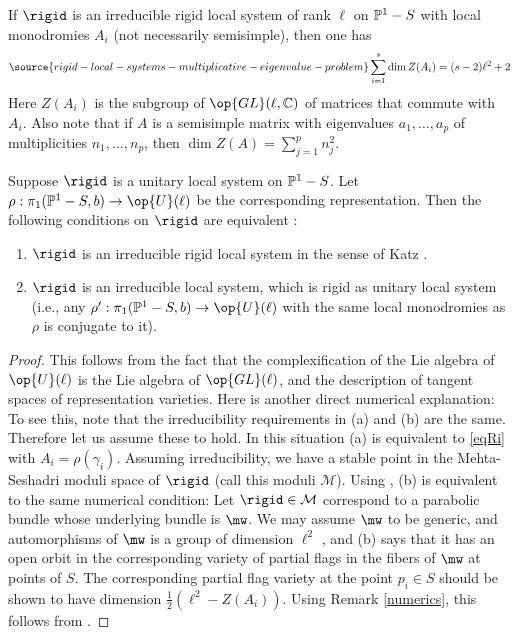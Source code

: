 \begin{remark}
\notready\label{numerics}
If $\rigid$  is an irreducible rigid local system of rank $\ell$  on $\Bbb{P}^1-S$ with local monodromies $A_i$ (not necessarily semisimple), then one has \cite[Theorem 1.1.2]{Katz}
\begin{equation}\label{eqRi}
\source{rigid-local-systems-multiplicative-eigenvalue-problem}
\sum_{i=1}^s \dim Z(A_i)= (s-2) \ell^2+2
\end{equation}
Here $Z(A_i)$ is the subgroup of $\op{GL}(\ell,\Bbb{C})$ of matrices that commute with $A_i$. Also note that if $A$ is a semisimple matrix  with eigenvalues $a_1,\dots,a_p$ of multiplicities $n_1,\dots,n_p$, then $\dim Z(A)=\sum_{j=1}^p n_j^2$.
\end{remark}
\begin{lemma}
\notready\label{RigidRem}
Suppose  $\rigid$ is a  unitary local system on $\Bbb{P}^1-S$. Let $\rho: \pi_1(\Bbb{P}^1-S,b)\to \op{U}(\ell)$ be the  corresponding representation. Then the following conditions on $\rigid$ are equivalent :
\begin{enumerate}
\item[(a)]$\rigid$ is an irreducible rigid local system in the sense of Katz \cite{Katz}.
\item[(b)] $\rigid$ is an irreducible local system, which is rigid as unitary local system (i.e., any $\rho': \pi_1(\Bbb{P}^1-S,b)\to \op{U}(\ell)$ with the same local monodromies as $\rho$ is conjugate to it).
\end{enumerate}
\end{lemma}
\begin{proof}
This follows from the fact that the complexification of the Lie algebra of $\op{U}(\ell)$ is the Lie algebra of $\op{GL}(\ell)$, and the description of tangent spaces of representation varieties. Here is another direct numerical explanation:
To see this, note that the irreducibility requirements in (a) and (b) are the same. Therefore let us assume these to hold. In this situation (a) is equivalent to \eqref{eqRi}  with $A_i=\rho(\gamma_i)$.
Assuming irreducibility, we have a stable point in the Mehta-Seshadri moduli space of $\rigid$ (call this moduli $\mathcal{M}$). Using \cite[Lemma 5.4]{BTIFR}, (b) is equivalent to the same numerical condition:
Let $\rigid\in\mathcal{M}$ correspond to a parabolic bundle whose underlying bundle is $\mw$. We may assume $\mw$ to be generic, and automorphisms of $\mw$ is a group of dimension $\ell^2$ \cite[Lemma 9.1]{BTIFR}, and (b) says that it has an open orbit in the  corresponding variety of partial flags in the fibers of $\mw$ at points of $S$. The corresponding partial  flag variety at the point $p_i\in S$ should be shown to have dimension $\frac{1}{2}(\ell^2-Z(A_i))$. Using Remark
\ref{numerics}, this follows from \cite[Lemma 1.2]{BTIFR}.
\end{proof}

